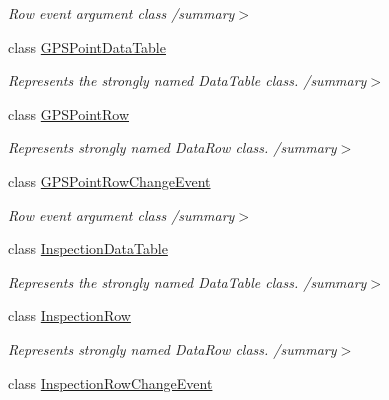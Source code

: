 \begin{DoxyCompactItemize}
\begin{DoxyCompactList}\small\item\em Row event argument class /summary$>$ \end{DoxyCompactList}\item 
class \hyperlink{class_env_int_1_1_win32_1_1_field_tech_1_1_manager_1_1_data_sets_1_1_guide_ware_mobile_data_set_1_1_g_p_s_point_data_table}{G\+P\+S\+Point\+Data\+Table}
\begin{DoxyCompactList}\small\item\em Represents the strongly named Data\+Table class. /summary$>$ \end{DoxyCompactList}\item 
class \hyperlink{class_env_int_1_1_win32_1_1_field_tech_1_1_manager_1_1_data_sets_1_1_guide_ware_mobile_data_set_1_1_g_p_s_point_row}{G\+P\+S\+Point\+Row}
\begin{DoxyCompactList}\small\item\em Represents strongly named Data\+Row class. /summary$>$ \end{DoxyCompactList}\item 
class \hyperlink{class_env_int_1_1_win32_1_1_field_tech_1_1_manager_1_1_data_sets_1_1_guide_ware_mobile_data_set_baf5953e40523560f37c87dac2e88271}{G\+P\+S\+Point\+Row\+Change\+Event}
\begin{DoxyCompactList}\small\item\em Row event argument class /summary$>$ \end{DoxyCompactList}\item 
class \hyperlink{class_env_int_1_1_win32_1_1_field_tech_1_1_manager_1_1_data_sets_1_1_guide_ware_mobile_data_set_1_1_inspection_data_table}{Inspection\+Data\+Table}
\begin{DoxyCompactList}\small\item\em Represents the strongly named Data\+Table class. /summary$>$ \end{DoxyCompactList}\item 
class \hyperlink{class_env_int_1_1_win32_1_1_field_tech_1_1_manager_1_1_data_sets_1_1_guide_ware_mobile_data_set_1_1_inspection_row}{Inspection\+Row}
\begin{DoxyCompactList}\small\item\em Represents strongly named Data\+Row class. /summary$>$ \end{DoxyCompactList}\item 
class \hyperlink{class_env_int_1_1_win32_1_1_field_tech_1_1_manager_1_1_data_sets_1_1_guide_ware_mobile_data_set_1_1_inspection_row_change_event}{Inspection\+Row\+Change\+Event}

\end{DoxyCompactItemize}
